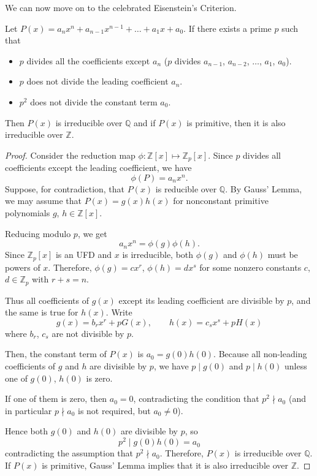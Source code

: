 \documentclass[11pt]{scrartcl}
\begin{document}
We can now move on to the celebrated Eisenstein's Criterion.

\begin{theorem*}
Let $P(x) = a_n x^n + a_{n-1} x^{n-1} + \dots + a_1 x + a_0$. If there exists a prime $p$ such that
\begin{itemize}
\item $p$ divides all the coefficients except $a_n$ ($p$ divides $a_{n-1}$, $a_{n-2}$, $\dots$, $a_1$, $a_0$).
\item $p$ does not divide the leading coefficient $a_n$.
\item $p^2$ does not divide the constant term $a_0$.
\end{itemize}
Then $P(x)$ is irreducible over $\mathbb{Q}$ and if $P(x)$ is primitive, then it is also irreducible over $\mathbb{Z}$.
\end{theorem*}
\begin{proof}
Consider the reduction map $\phi:\mathbb{Z}[x]\mapsto\mathbb{Z}_p[x]$. Since $p$ divides all coefficients except the leading coefficient, we have \[\phi(P)=a_nx^n.\] Suppose, for contradiction, that $P(x)$ is reducible over $\mathbb{Q}$. By Gauss' Lemma, we may assume that $P(x)=g(x)h(x)$ for nonconstant primitive polynomials $g$, $h\in\mathbb{Z}[x]$.

Reducing modulo $p$, we get \[a_nx^n=\phi(g)\phi(h).\] Since $\mathbb{Z}_p[x]$ is an UFD and $x$ is irreducible, both $\phi(g)$ and $\phi(h)$ must be powers of $x$. Therefore, $\phi(g)=c x^r$, $\phi(h)=d x^s$ for some nonzero constants $c$, $d\in\mathbb{Z}_p$ with $r+s=n$.

Thus all coefficients of $g(x)$ except its leading coefficient are divisible by $p$, and the same is true for $h(x)$. Write \[g(x)=b_rx^r+pG(x),\qquad h(x)=c_sx^s+pH(x)\] where $b_r$, $c_s$ are not divisible by $p$.

Then, the constant term of $P(x)$ is $a_0=g(0)h(0)$. Because all non-leading coefficients of $g$ and $h$ are divisible by $p$, we have $p\mid g(0)$ and $p\mid h(0)$ unless one of $g(0)$, $h(0)$ is zero.

If one of them is zero, then $a_0=0$, contradicting the condition that $p^2\nmid a_0$ (and in particular $p\nmid a_0$ is not required, but $a_0\neq0$).

Hence both $g(0)$ and $h(0)$ are divisible by $p$, so \[p^2\mid g(0)h(0)=a_0\]contradicting the assumption that $p^2\nmid a_0$. Therefore, $P(x)$ is irreducible over $\mathbb{Q}$. If $P(x)$ is primitive, Gauss' Lemma implies that it is also irreducible over $\mathbb{Z}$.
\end{proof}
\end{document}

